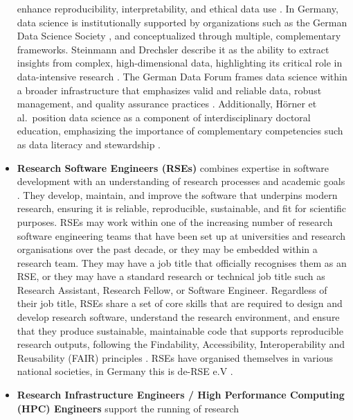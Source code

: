 \documentclass[
        english,biblatex
    ]{lni}
\begin{document}
\begin{itemize}
      enhance reproducibility, interpretability, and ethical data use
      \autocite{Donoho201750}. In Germany, data science is
      institutionally supported by organizations such as the German Data
      Science Society \autocite{George2016Big}, and conceptualized
      through multiple, complementary frameworks. Steinmann and
      Drechsler describe it as the ability to extract insights from
      complex, high-dimensional data, highlighting its critical role in
      data-intensive research \autocite{Steinmann2021Verzahnung}. The
      German Data Forum frames data science within a broader
      infrastructure that emphasizes valid and reliable data, robust
      management, and quality assurance practices
      \autocite{ed2011Building}. Additionally, Hörner et al.~position
      data science as a component of interdisciplinary doctoral
      education, emphasizing the importance of complementary
      competencies such as data literacy and stewardship
      \autocite{Horner2021Disziplinubergreifendes}.
    \item
      \textbf{Research Software Engineers (RSEs)} combines expertise in
      software development with an understanding of research processes
      and academic goals \autocite{zenodo495360}. They develop,
      maintain, and improve the software that underpins modern research,
      ensuring it is reliable, reproducible, sustainable, and fit for
      scientific purposes. RSEs may work within one of the increasing
      number of research software engineering teams that have been set
      up at universities and research organisations over the past
      decade, or they may be embedded within a research team. They may
      have a job title that officially recognises them as an RSE, or
      they may have a standard research or technical job title such as
      Research Assistant, Research Fellow, or Software Engineer.
      Regardless of their job title, RSEs share a set of core skills
      that are required to design and develop research software,
      understand the research environment, and ensure that they produce
      sustainable, maintainable code that supports reproducible research
      outputs, following the Findability, Accessibility,
      Interoperability and Reusability (FAIR) principles
      \autocite{Goth2024RSE}. RSEs have organised themselves in various
      national societies, in Germany this is de-RSE e.V
      \autocite{derseev}.
    \item
      \textbf{Research Infrastructure Engineers / High Performance
      Computing (HPC) Engineers} support the running of research

\end{itemize}
\end{document}
